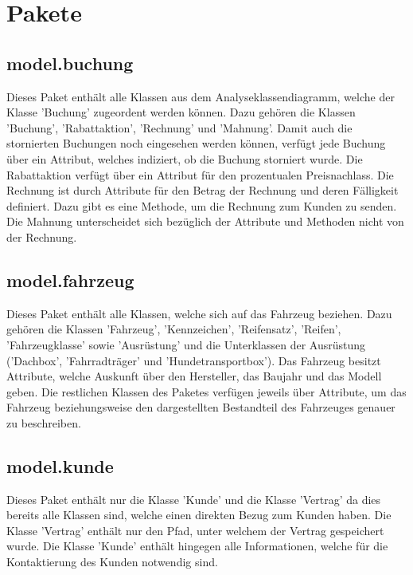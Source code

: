 \newpage

\section{Pakete}

\subsection{model.buchung}

Dieses Paket enthält alle Klassen aus dem Analyseklassendiagramm, welche der Klasse 'Buchung' zugeordent werden können. Dazu gehören die Klassen 'Buchung', 'Rabattaktion', 'Rechnung' und 'Mahnung'. Damit auch die stornierten Buchungen noch eingesehen werden können, verfügt jede Buchung über ein Attribut, welches indiziert, ob die Buchung storniert wurde. Die Rabattaktion verfügt über ein Attribut für den prozentualen Preisnachlass. Die Rechnung ist durch Attribute für den Betrag der Rechnung und deren Fälligkeit definiert. Dazu gibt es eine Methode, um die Rechnung zum Kunden zu senden. Die Mahnung unterscheidet sich bezüglich der Attribute und Methoden nicht von der Rechnung.

\subsection{model.fahrzeug}

Dieses Paket enthält alle Klassen, welche sich auf das Fahrzeug beziehen. Dazu gehören die Klassen 'Fahrzeug', 'Kennzeichen', 'Reifensatz', 'Reifen', 'Fahrzeugklasse' sowie 'Ausrüstung' und die Unterklassen der Ausrüstung ('Dachbox', 'Fahrradträger' und 'Hundetransportbox').
Das Fahrzeug besitzt Attribute, welche Auskunft über den Hersteller, das Baujahr und das Modell geben. Die restlichen Klassen des Paketes verfügen jeweils über Attribute, um das Fahrzeug beziehungsweise den dargestellten Bestandteil des Fahrzeuges genauer zu beschreiben. 

\subsection{model.kunde}

Dieses Paket enthält nur die Klasse 'Kunde' und die Klasse 'Vertrag' da dies bereits alle Klassen sind, welche einen direkten Bezug zum Kunden haben.
Die Klasse 'Vertrag' enthält nur den Pfad, unter welchem der Vertrag gespeichert wurde. Die Klasse 'Kunde' enthält hingegen alle Informationen, welche für die Kontaktierung des Kunden notwendig sind.

